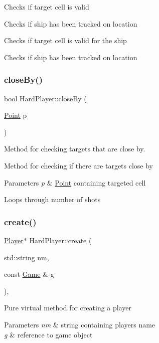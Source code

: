 Checks if target cell is valid

Checks if ship has been tracked on location

Checks if target cell is valid for the ship

Checks if ship has been tracked on location \mbox{\label{class_hard_player_a91cdd6239e111ea02bff561f6a3a0c41}} 
\subsubsection{\texorpdfstring{close\+By()}{closeBy()}}
{\footnotesize\ttfamily bool Hard\+Player\+::close\+By (\begin{DoxyParamCaption}\item[{\mbox{\hyperlink{class_point}{Point}}}]{p }\end{DoxyParamCaption})}



Method for checking target\textquotesingle{}s that are close by. 

Method for checking if there are targets close by 
\begin{DoxyParams}{Parameters}
{\em p} & \mbox{\hyperlink{class_point}{Point}} containing targeted cell \\
\hline
\end{DoxyParams}
Loops through number of shots \mbox{\label{class_hard_player_ab3e76893b9c5163a33ea91b201715a98}} 
\subsubsection{\texorpdfstring{create()}{create()}}
{\footnotesize\ttfamily \mbox{\hyperlink{class_player}{Player}}$\ast$ Hard\+Player\+::create (\begin{DoxyParamCaption}\item[{std\+::string}]{nm,  }\item[{const \mbox{\hyperlink{class_game}{Game}} \&}]{g }\end{DoxyParamCaption})\hspace{0.3cm}{\ttfamily [inline]}, {\ttfamily [virtual]}}

Pure virtual method for creating a player 
\begin{DoxyParams}{Parameters}
{\em nm} & string containing player\textquotesingle{}s name \\
\hline
{\em g} & reference to game object \\
\hline
\end{DoxyParams}


